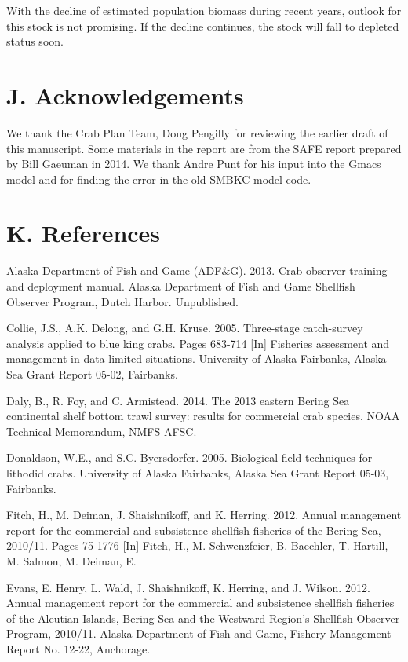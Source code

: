 \documentclass[]{article}
\begin{document}
With the decline of estimated population biomass during recent years,
outlook for this stock is not promising. If the decline continues, the
stock will fall to depleted status soon.

\section{J. Acknowledgements}\label{j.-acknowledgements}

We thank the Crab Plan Team, Doug Pengilly for reviewing the earlier
draft of this manuscript. Some materials in the report are from the SAFE
report prepared by Bill Gaeuman in 2014. We thank Andre Punt for his
input into the Gmacs model and for finding the error in the old SMBKC
model code.

\section{K. References}\label{k.-references}

Alaska Department of Fish and Game (ADF\&G). 2013. Crab observer
training and deployment manual. Alaska Department of Fish and Game
Shellfish Observer Program, Dutch Harbor. Unpublished.

Collie, J.S., A.K. Delong, and G.H. Kruse. 2005. Three-stage
catch-survey analysis applied to blue king crabs. Pages 683-714 {[}In{]}
Fisheries assessment and management in data-limited situations.
University of Alaska Fairbanks, Alaska Sea Grant Report 05-02,
Fairbanks.

Daly, B., R. Foy, and C. Armistead. 2014. The 2013 eastern Bering Sea
continental shelf bottom trawl survey: results for commercial crab
species. NOAA Technical Memorandum, NMFS-AFSC.

Donaldson, W.E., and S.C. Byersdorfer. 2005. Biological field techniques
for lithodid crabs. University of Alaska Fairbanks, Alaska Sea Grant
Report 05-03, Fairbanks.

Fitch, H., M. Deiman, J. Shaishnikoff, and K. Herring. 2012. Annual
management report for the commercial and subsistence shellfish fisheries
of the Bering Sea, 2010/11. Pages 75-1776 {[}In{]} Fitch, H., M.
Schwenzfeier, B. Baechler, T. Hartill, M. Salmon, M. Deiman, E.

Evans, E. Henry, L. Wald, J. Shaishnikoff, K. Herring, and J. Wilson.
2012. Annual management report for the commercial and subsistence
shellfish fisheries of the Aleutian Islands, Bering Sea and the Westward
Region's Shellfish Observer Program, 2010/11. Alaska Department of Fish
and Game, Fishery Management Report No. 12-22, Anchorage.
\end{document}
